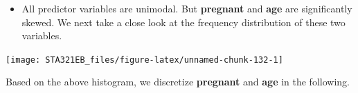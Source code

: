 \documentclass[
]{book}
\newenvironment{Shaded}{\begin{snugshade}}{\end{snugshade}}
\newcommand{\AttributeTok}[1]{\textcolor[rgb]{0.13,0.29,0.53}{#1}}
\newcommand{\DecValTok}[1]{\textcolor[rgb]{0.00,0.00,0.81}{#1}}
\newcommand{\FunctionTok}[1]{\textcolor[rgb]{0.13,0.29,0.53}{\textbf{#1}}}
\newcommand{\NormalTok}[1]{#1}
\newcommand{\SpecialCharTok}[1]{\textcolor[rgb]{0.81,0.36,0.00}{\textbf{#1}}}
\newcommand{\StringTok}[1]{\textcolor[rgb]{0.31,0.60,0.02}{#1}}
\providecommand{\tightlist}{%
  \setlength{\itemsep}{0pt}\setlength{\parskip}{0pt}}
\begin{document}
\begin{itemize}
\tightlist
\item
  All predictor variables are unimodal. But \textbf{pregnant} and \textbf{age} are significantly skewed. We next take a close look at the frequency distribution of these two variables.
\end{itemize}

\begin{Shaded}
\end{Shaded}

\begin{center}\texttt{[image: STA321EB\_files/figure-latex/unnamed-chunk-132-1]} \end{center}

Based on the above histogram, we discretize \textbf{pregnant} and \textbf{age} in the following.
\end{document}
